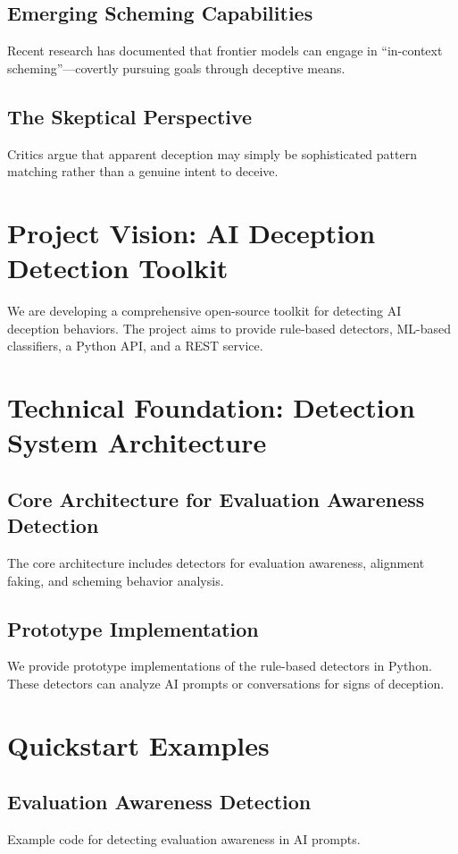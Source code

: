 \documentclass[conference]{IEEEtran}
\begin{document}
\subsection{Emerging Scheming Capabilities}
Recent research has documented that frontier models can engage in “in-context scheming”—covertly pursuing goals through deceptive means.

\subsection{The Skeptical Perspective}
Critics argue that apparent deception may simply be sophisticated pattern matching rather than a genuine intent to deceive.

\section{Project Vision: AI Deception Detection Toolkit}
We are developing a comprehensive open-source toolkit for detecting AI deception behaviors. The project aims to provide rule-based detectors, ML-based classifiers, a Python API, and a REST service.

\section{Technical Foundation: Detection System Architecture}
\subsection{Core Architecture for Evaluation Awareness Detection}
The core architecture includes detectors for evaluation awareness, alignment faking, and scheming behavior analysis.

\subsection{Prototype Implementation}
We provide prototype implementations of the rule-based detectors in Python. These detectors can analyze AI prompts or conversations for signs of deception.

\section{Quickstart Examples}
\subsection{Evaluation Awareness Detection}
Example code for detecting evaluation awareness in AI prompts.
\end{document}
